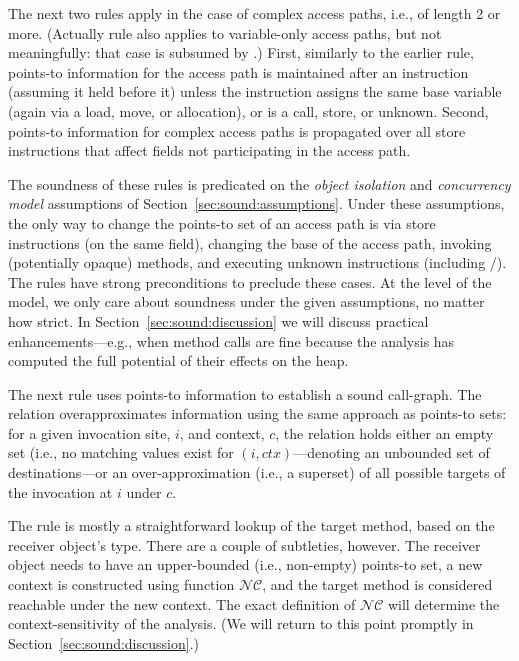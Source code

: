 The next two rules apply in the case of complex access paths, i.e., of length 2 or more. (Actually rule  also applies to variable-only access paths, but not meaningfully: that case is subsumed by .) First, similarly to the earlier rule, points-to information for the access path is maintained after an instruction (assuming it held before it) unless the instruction assigns the same base variable (again via a load, move, or allocation), or is a call, store, or unknown. Second, points-to information for complex access paths is propagated over all store instructions that affect fields not participating in the access path.

The soundness of these rules is predicated on the \emph{object isolation} and \emph{concurrency model} assumptions of Section~\ref{sec:sound:assumptions}. Under these assumptions, the only way to change the points-to set of an access path is via store instructions (on the same field), changing the base of the access path, invoking (potentially opaque) methods, and executing unknown instructions (including /). The rules have strong preconditions to preclude these cases. At the level of the model, we only care about soundness under the given assumptions, no matter how strict. In Section~\ref{sec:sound:discussion} we will discuss practical enhancements---e.g., when method calls are fine because the analysis has computed the full potential of their effects on the heap.


The next rule uses points-to information to establish a sound call-graph. The  relation overapproximates information using the same approach as points-to sets: for a given invocation site, $i$, and context, $c$, the relation holds either an empty set (i.e., no matching values exist for $(i, ctx)$---denoting an unbounded set of destinations---or an over-approximation (i.e., a superset) of all possible targets of the invocation at $i$ under $c$.

The rule is mostly a straightforward lookup of the target method, based on the receiver object's type. There are a couple of subtleties, however. The receiver object needs to have an upper-bounded (i.e., non-empty) points-to set, a new context is constructed using function $\mathcal{NC}$, and the target method is considered reachable under the new context. The exact definition of $\mathcal{NC}$ will determine the context-sensitivity of the analysis. (We will return to this point promptly in Section~\ref{sec:sound:discussion}.)


